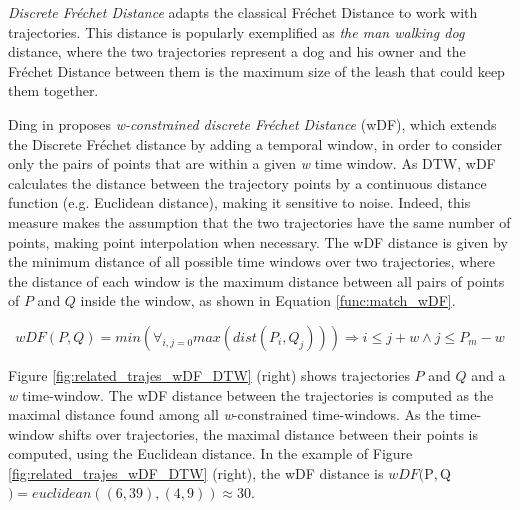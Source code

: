 \documentclass[12pt]{article}
\begin{document}
{\emph{Discrete Fr{\'e}chet Distance} }\cite{eiter1994computing}{adapts the classical Fr{\'e}chet Distance }\cite{Frechet1906}{ to work with trajectories. This distance is popularly exemplified as \textit{the man walking dog} distance, where the two trajectories represent a dog and his owner and the Fr{\'e}chet Distance between them is the maximum size of the leash that could keep them together.}

Ding in \cite{Ding:2008:ESJ:1440463.1440989} proposes \emph{w-constrained discrete Fr{\'e}chet Distance} (wDF), which extends the Discrete Fr{\'e}chet distance \cite{eiter1994computing} by adding a temporal window, in order to consider only the pairs of points that are within a given \emph{w} time window. {As DTW, wDF calculates the distance between the trajectory points by a continuous distance function (e.g. Euclidean distance), making it sensitive to noise}. Indeed, this measure makes the assumption that the two trajectories have the same number of points, making point interpolation when necessary. The wDF distance is given by the minimum distance of all possible time windows over two trajectories, where the distance of each window is the maximum distance between all pairs of points of $P$ and $Q$ inside the window, as shown in Equation \ref{func:match_wDF}.

\begin{equation}
\label{func:match_wDF}
  wDF(P, Q) = min(\forall_{i,j=0}max(dist(P_i, Q_j))) \Rightarrow i \leq j + w \land
  j \leq P_{m} - w
\end{equation}

Figure \ref{fig:related_trajes_wDF_DTW} (right) shows trajectories $P$ and $Q$ and a \emph{w} time-window. The wDF distance between the trajectories is computed as the maximal distance found among all \emph{w}-constrained time-windows. As the time-window shifts over trajectories, the maximal distance between their points is computed, using the Euclidean distance. In the example of Figure \ref{fig:related_trajes_wDF_DTW} (right), the wDF distance is $wDF($P$, $Q$) = euclidean((6,39), (4,9)) \approx 30$.
\end{document}
